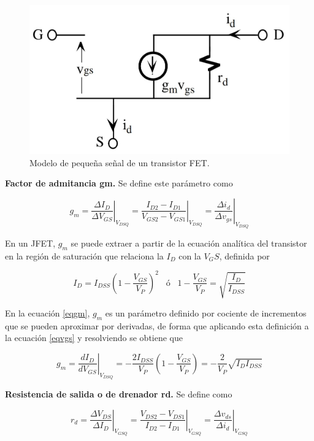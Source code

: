 \documentclass[12pt, a4paper]{article}
\begin{document}
    \begin{figure}[h!]
        \centering
        \includegraphics[height=5cm\textwidth]{pequenasenal.jpg}
        \caption{Modelo de pequeña señal de un transistor FET.}
        \label{fig:mt1}
    \end{figure}

    {\bf Factor de admitancia gm.} Se define este parámetro como

    \begin{equation} \label{eqgm}
        g_m = \left.\frac{\Delta I_D}{\Delta V_{GS}}\right|_{V_{DSQ}} = \left.\frac{I_{D2}-I_{D1}}{V_{GS2}-V_{GS1}}\right|_{V_{DSQ}} = \left.\frac{\Delta i_d}{\Delta v_{gs}}\right|_{V_{DSQ}}
    \end{equation}

    En un JFET, $g_m$ se puede extraer a partir de la ecuación analítica del transistor en la región de saturación que relaciona la $I_D$ con la $V_GS$, definida por

    \begin{equation} \label{eqvgs}
        I_D = I_{DSS}\left(1-\frac{V_{GS}}{V_P}\right)^2 \;\;\; ó \;\;\; 1-\frac{V_{GS}}{V_P} = \sqrt{\frac{I_D}{I_{DSS}}}
    \end{equation}

    En la ecuación \eqref{eqgm}, $g_m$ es un parámetro definido por cociente de incrementos que se pueden aproximar por derivadas, de forma que aplicando esta definición a la ecuación \eqref{eqvgs} y resolviendo se obtiene que

    \begin{equation} \label{eqdgm}
        g_m = \left.\frac{d I_D}{d V_{GS}}\right|_{V_{DSQ}} = -\frac{2I_{DSS}}{V_P}\left(1-\frac{V_{GS}}{V_P}\right) = -\frac{2}{V_P}\sqrt{I_DI_{DSS}}
    \end{equation}

    {\bf Resistencia de salida o de drenador rd.} Se define como

    \begin{equation} \label{eqrd}
        r_d = \left.\frac{\Delta V_{DS}}{\Delta I_D}\right|_{V_{GSQ}} = \left.\frac{V_{DS2}-V_{DS1}}{I_{D2}-I_{D1}}\right|_{V_{GSQ}} = \left.\frac{\Delta v_{ds}}{\Delta i_d}\right|_{V_{GSQ}}
    \end{equation}
\end{document}
